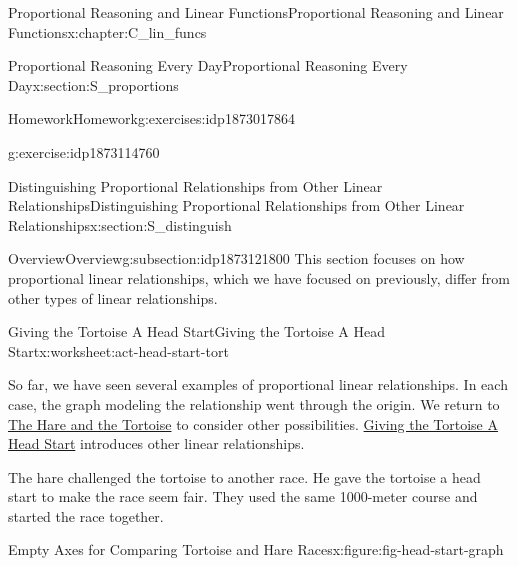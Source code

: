 \documentclass[oneside,10pt,]{book}
\numberwithin{equation}{chapter}
\begin{document}
\begin{chapterptx}{Proportional Reasoning and Linear Functions}{}{Proportional Reasoning and Linear Functions}{}{}{x:chapter:C_lin_funcs}
\begin{sectionptx}{Proportional Reasoning Every Day}{}{Proportional Reasoning Every Day}{}{}{x:section:S_proportions}
\begin{exercises-subsection}{Homework}{}{Homework}{}{}{g:exercises:idp1873017864}
\begin{divisionexercise}{10}{}{}{g:exercise:idp1873114760}
\end{divisionexercise}%
\end{exercises-subsection}
\end{sectionptx}
%
%
\typeout{************************************************}
\typeout{************************************************}
%
\begin{sectionptx}{Distinguishing Proportional Relationships from Other Linear Relationships}{}{Distinguishing Proportional Relationships from Other Linear Relationships}{}{}{x:section:S_distinguish}
%
%
\typeout{************************************************}
\typeout{************************************************}
%
\begin{subsectionptx}{Overview}{}{Overview}{}{}{g:subsection:idp1873121800}
This section focuses on how proportional linear relationships, which we have focused on previously, differ from other types of linear relationships.%
\end{subsectionptx}
%
%
\typeout{************************************************}
\typeout{************************************************}
%
\begin{worksheet-subsection}{Giving the Tortoise A Head Start}{}{Giving the Tortoise A Head Start}{}{}{x:worksheet:act-head-start-tort}
\begin{introduction}{}%
So far, we have seen several examples of proportional linear relationships. In each case, the graph modeling the relationship went through the origin. We return to \hyperref[x:worksheet:act-hare-tort]{The Hare and the Tortoise} to consider other possibilities. \hyperref[x:worksheet:act-head-start-tort]{Giving the Tortoise A Head Start} introduces other linear relationships.%
\par
The hare challenged the tortoise to another race. He gave the tortoise a head start to make the race seem fair. They used the same 1000-meter course and started the race together.%
\begin{figureptx}{Empty Axes for Comparing Tortoise and Hare Races}{x:figure:fig-head-start-graph}{}%
\begin{image}{0.1}{0.8}{0.1}%

\end{image}
\end{figureptx}
\end{introduction}
\end{worksheet-subsection}
\end{sectionptx}
\end{chapterptx}
\end{document}
